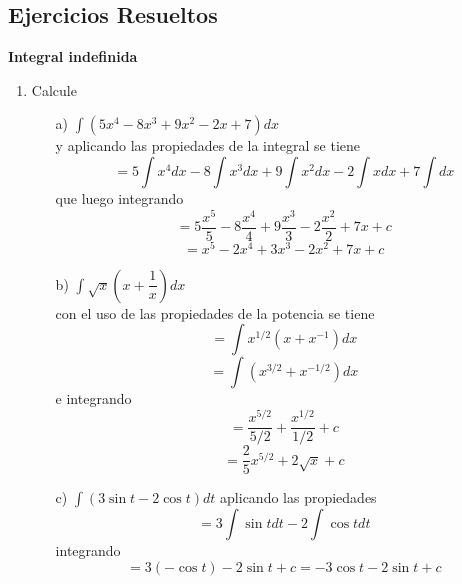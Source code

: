 \documentclass[10pt,twoside]{SelfArx} %
\begin{document}
 \subsection{Ejercicios Resueltos}
\textbf{Integral indefinida}\\
\begin{enumerate}
	


\item Calcule
\begin{enumerate}
	

\item[a)] $  \int(5x^{4}-8x^{3}+9x^{2}-2x+7)dx  $\\
y aplicando las propiedades de la integral se tiene
\begin{equation}
= 5\int x^{4}dx-8\int x^{3}dx+9\int x^{2}dx-2\int xdx+7\int dx
\end{equation}
que luego integrando
\begin{equation}
= 5\dfrac{x^{5}}{5}-8 \dfrac{x^{4}}{4}+9 \dfrac{x^{3}}{3}-2 \dfrac{x^{2}}{2}+7x+c
\end{equation}
\begin{equation}
= x^{5}-2x^{4}+3x^{3}-2 x^{2}+7x+c
\end{equation}
\item[b)] $ \int \sqrt{x}\left (x+\dfrac{1}{x}\right )dx $\\
con el uso de las propiedades de la potencia se tiene
\begin{equation}
=\int x^{1/2}(x+x^{-1})dx
\end{equation}
\begin{equation}
=\int (x^{3/2}+x^{-1/2})dx
\end{equation}
e integrando
\begin{equation}
=\dfrac{x^{5/2}}{5/2}+\dfrac{x^{1/2}}{1/2}+c
\end{equation}
\begin{equation}
=\dfrac{2}{5}x^{5/2}+2\sqrt{x}+c
\end{equation}


\item[c)] $ \int (3\sin t-2\cos t)dt $
aplicando las propiedades
\begin{equation}
=3\int\sin tdt-2\int\cos tdt
\end{equation}
integrando
\begin{equation}
=3(-\cos t)-2\sin t+c=-3\cos t-2\sin t+c
\end{equation}
\end{enumerate}



\end{enumerate}
\end{document}
